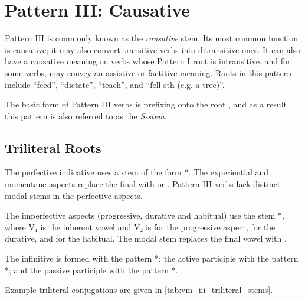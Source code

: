 \documentclass[grammar]{subfiles}
\begin{document}
\section{Pattern III: Causative}
\label{sec:vm_pattern_iii}

Pattern III is commonly known as the \emph{causative} stem.  Its most common
function is causative; it may also convert transitive verbs into ditransitive
ones.  It can also have a causative meaning on verbs whose Pattern I root is
intransitive, and for some verbs, may convey an assistive or factitive meaning.
Roots in this pattern include  “feed”,  “dictate”,
 “teach”, and  “fell sth (e.g. a tree)”.

The basic form of Pattern III verbs is prefixing  onto the root
, and as a result this pattern is also referred to as the
\emph{S-stem}. 



\subsection{Triliteral Roots}
\label{ssec:vm_iii_triliteral}

The perfective indicative uses a stem of the form *. The
experiential and momentane aspects replace the final  with  or
.  Pattern III verbs lack distinct modal stems in the perfective aspects.  

The imperfective aspects (progressive, durative and  habitual) use the stem
*, where V₁ is the inherent vowel and V₂ is  for the
progressive aspect,  for the durative, and  for the habitual.
The modal stem replaces the final vowel with . 

The infinitive is formed with the pattern *; the active participle
with the pattern *; and the passive participle with the pattern
*.

Example triliteral conjugations are given in \cref{tab:vm_iii_triliteral_stems}. 
\end{document}
